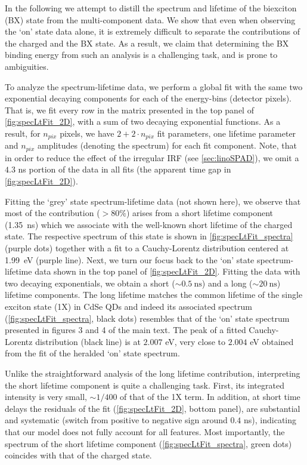 \documentclass[journal=nalefd, manuscript=letter, layout=twocolumn]{achemso}
\begin{document}
In the following we attempt to distill the spectrum and lifetime of the biexciton (BX) state from the multi-component data. We show that even when observing the `on' state data alone, it is extremely difficult to separate the contributions of the charged and the BX state. As a result, we claim that determining the BX binding energy from such an analysis is a challenging task, and is prone to ambiguities.

To analyze the spectrum-lifetime data, we perform a global fit with the same two exponential decaying components for each of the energy-bins (detector pixels). That is, we fit every row in the matrix presented in the top panel of \autoref{fig:specLtFit_2D}, with a sum of two decaying exponential functions. As a result, for $n_{pix}$ pixels, we have $2+2{\cdot}n_{pix}$ fit parameters, one lifetime parameter and $n_{pix}$ amplitudes (denoting the spectrum) for each fit component. Note, that in order to reduce the effect of the irregular IRF (see \autoref{sec:linoSPAD}), we omit a $4.3$ ns portion of the data in all fits (the apparent time gap in \autoref{fig:specLtFit_2D}).

Fitting the `grey' state spectrum-lifetime data (not shown here), we observe that most of the contribution ($>80\%$) arises from a short lifetime component (\SI{1.35}{\ns}) which we associate with the well-known short lifetime of the charged state. The respective spectrum of this state is shown in \autoref{fig:specLtFit_spectra} (purple dots) together with a fit to a Cauchy-Lorentz distribution centered at \SI{1.99}{\eV} (purple line).
Next, we turn our focus back to the `on' state spectrum-lifetime data shown in the top panel of \autoref{fig:specLtFit_2D}. Fitting the data with two decaying exponentials, we obtain a short (${\sim}\SI{0.5}{\ns}$) and a long (${\sim}\SI{20}{\ns}$) lifetime components. The long lifetime matches the common lifetime of the single exciton state (1X) in CdSe QDs and indeed its associated spectrum (\autoref{fig:specLtFit_spectra}, black dots) resembles that of the `on' state spectrum presented in figures 3 and 4 of the main text. The peak of a fitted Cauchy-Lorentz distribution (black line) is at $2.007$ eV, very close to $2.004$ eV obtained from the fit of the heralded `on' state spectrum.

Unlike the straightforward analysis of the long lifetime contribution, interpreting the short lifetime component is quite a challenging task. First, its integrated intensity is very small, ${\sim}1/400$ of that of the 1X term. In addition, at short time delays the residuals of the fit (\autoref{fig:specLtFit_2D}, bottom panel), are substantial and systematic (switch from positive to negative sign around $0.4$ ns), indicating that our model does not fully account for all features. Most importantly, the spectrum of the short lifetime component (\autoref{fig:specLtFit_spectra}, green dots) coincides with that of the charged state.
\end{document}
